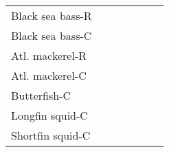 \documentclass[11pt,]{article}
\begin{document}
\begin{table}[H]
\begin{tabular}{lllllll}
Black sea bass-R & \multicolumn{1}{c}{\cellcolor{red}{\textcolor{gray}{h}}} & \multicolumn{1}{c}{\cellcolor{green}{\textcolor{gray}{l}}} & \multicolumn{1}{c}{\cellcolor{orange}{\textcolor{gray}{mh}}} & \multicolumn{1}{c}{\cellcolor{red}{\textcolor{gray}{h}}} & \multicolumn{1}{c}{\cellcolor{orange}{\textcolor{gray}{mh}}} & \multicolumn{1}{c}{\cellcolor{red}{\textcolor{gray}{h}}}\\
Black sea bass-C & \multicolumn{1}{c}{\cellcolor{yellow}{\textcolor{gray}{lm}}} & \multicolumn{1}{c}{\cellcolor{yellow}{\textcolor{gray}{lm}}} & \multicolumn{1}{c}{\cellcolor{red}{\textcolor{gray}{h}}} & \multicolumn{1}{c}{\cellcolor{orange}{\textcolor{gray}{mh}}} & \multicolumn{1}{c}{\cellcolor{yellow}{\textcolor{gray}{lm}}} & \multicolumn{1}{c}{\cellcolor{red}{\textcolor{gray}{h}}}\\
Atl. mackerel-R & \multicolumn{1}{c}{\cellcolor{green}{\textcolor{gray}{l}}} & \multicolumn{1}{c}{\cellcolor{green}{\textcolor{gray}{l}}} & \multicolumn{1}{c}{\cellcolor{green}{\textcolor{gray}{l}}} & \multicolumn{1}{c}{\cellcolor{green}{\textcolor{gray}{l}}} & \multicolumn{1}{c}{\cellcolor{green}{\textcolor{gray}{l}}} & \multicolumn{1}{c}{\cellcolor{red}{\textcolor{gray}{h}}}\\
Atl. mackerel-C & \multicolumn{1}{c}{\cellcolor{green}{\textcolor{gray}{l}}} & \multicolumn{1}{c}{\cellcolor{yellow}{\textcolor{gray}{lm}}} & \multicolumn{1}{c}{\cellcolor{orange}{\textcolor{gray}{mh}}} & \multicolumn{1}{c}{\cellcolor{red}{\textcolor{gray}{h}}} & \multicolumn{1}{c}{\cellcolor{yellow}{\textcolor{gray}{lm}}} & \multicolumn{1}{c}{\cellcolor{red}{\textcolor{gray}{h}}}\\
Butterfish-C & \multicolumn{1}{c}{\cellcolor{green}{\textcolor{gray}{l}}} & \multicolumn{1}{c}{\cellcolor{yellow}{\textcolor{gray}{lm}}} & \multicolumn{1}{c}{\cellcolor{orange}{\textcolor{gray}{mh}}} & \multicolumn{1}{c}{\cellcolor{red}{\textcolor{gray}{h}}} & \multicolumn{1}{c}{\cellcolor{orange}{\textcolor{gray}{mh}}} & \multicolumn{1}{c}{\cellcolor{green}{\textcolor{gray}{l}}}\\
Longfin squid-C & \multicolumn{1}{c}{\cellcolor{green}{\textcolor{gray}{l}}} & \multicolumn{1}{c}{\cellcolor{orange}{\textcolor{gray}{mh}}} & \multicolumn{1}{c}{\cellcolor{red}{\textcolor{gray}{h}}} & \multicolumn{1}{c}{\cellcolor{red}{\textcolor{gray}{h}}} & \multicolumn{1}{c}{\cellcolor{red}{\textcolor{gray}{h}}} & \multicolumn{1}{c}{\cellcolor{red}{\textcolor{gray}{h}}}\\
Shortfin squid-C & \multicolumn{1}{c}{\cellcolor{green}{\textcolor{gray}{l}}} & \multicolumn{1}{c}{\cellcolor{yellow}{\textcolor{gray}{lm}}} & \multicolumn{1}{c}{\cellcolor{yellow}{\textcolor{gray}{lm}}} & \multicolumn{1}{c}{\cellcolor{yellow}{\textcolor{gray}{lm}}} & \multicolumn{1}{c}{\cellcolor{green}{\textcolor{gray}{l}}} & \multicolumn{1}{c}{\cellcolor{green}{\textcolor{gray}{l}}}\\

\end{tabular}
\end{table}
\end{document}
